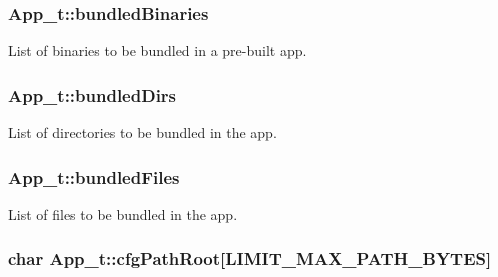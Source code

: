 \subsubsection[{\texorpdfstring{bundled\+Binaries}{bundledBinaries}}]{ App\+\_\+t\+::bundled\+Binaries}\hypertarget{struct_app__t_a5003e0be23052b9f7d41d08cac9e3aeb}{}\label{struct_app__t_a5003e0be23052b9f7d41d08cac9e3aeb}


List of binaries to be bundled in a pre-\/built app. 

\subsubsection[{\texorpdfstring{bundled\+Dirs}{bundledDirs}}]{ App\+\_\+t\+::bundled\+Dirs}\hypertarget{struct_app__t_add4b5c614e370be2a157587a749b5f32}{}\label{struct_app__t_add4b5c614e370be2a157587a749b5f32}


List of directories to be bundled in the app. 

\subsubsection[{\texorpdfstring{bundled\+Files}{bundledFiles}}]{ App\+\_\+t\+::bundled\+Files}\hypertarget{struct_app__t_ab56c092508e0e6f343abc4e297b7770b}{}\label{struct_app__t_ab56c092508e0e6f343abc4e297b7770b}


List of files to be bundled in the app. 

\subsubsection[{\texorpdfstring{cfg\+Path\+Root}{cfgPathRoot}}]{\setlength{\rightskip}{0pt plus 5cm}char App\+\_\+t\+::cfg\+Path\+Root\mbox{[}{\bf L\+I\+M\+I\+T\+\_\+\+M\+A\+X\+\_\+\+P\+A\+T\+H\+\_\+\+B\+Y\+T\+ES}\mbox{]}}\hypertarget{struct_app__t_af940cbec1d49e8b8325bbf78d1af614f}{}\label{struct_app__t_af940cbec1d49e8b8325bbf78d1af614f}
